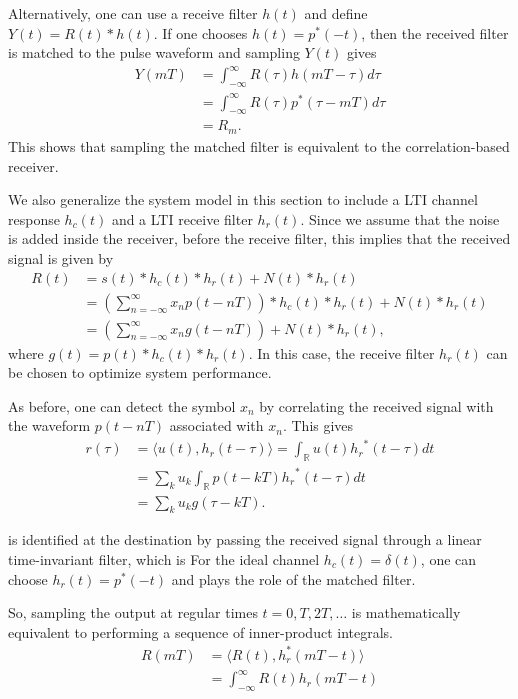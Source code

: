 Alternatively, one can use a receive filter $h(t)$ and define $Y(t) = R(t) * h(t)$.
If one chooses $h(t) = p^* (-t)$, then the received filter is matched to the pulse waveform and sampling $Y(t)$ gives
\begin{align*}
Y(mT)
&= \int_{-\infty}^{\infty} R(\tau) h(mT-\tau) d \tau \\
&= \int_{-\infty}^{\infty} R(\tau) p^* (\tau - mT) d \tau \\
&= R_m .
\end{align*}
This shows that sampling the matched filter is equivalent to the correlation-based receiver.


\iffalse
We also generalize the system model in this section to include a LTI channel response $h_c (t)$ and a LTI receive filter $h_r (t)$.
Since we assume that the noise is added inside the receiver, before the receive filter, this implies that the received signal is given by
\begin{align*}
R(t)
&= s(t) * h_c (t) * h_r (t) + N(t) * h_r(t) \\
&= \left( \sum_{n = -\infty}^{\infty} x_n p (t - nT) \right) * h_c (t) * h_r (t) + N(t) * h_r(t) \\
&= \left( \sum_{n = -\infty}^{\infty} x_n g(t - nT) \right) + N(t) * h_r(t),
\end{align*}
where $g(t) = p (t) * h_c (t) * h_r (t)$.
In this case, the receive filter $h_r (t)$ can be chosen to optimize system performance.

As before, one can detect the symbol $x_n$  by correlating the received signal with the waveform $p(t-nT)$ associated with $x_n$.
This gives
\begin{equation} \label{equation:InnerProductReceiver}
\begin{split}
r(\tau) &= \langle u(t), h_r (t-\tau) \rangle
= \int_{\mathbb{R}} u(t) {h_r}^*(t-\tau) dt \\
&= \sum_{k} u_k \int_{\mathbb{R}} p(t - kT) {h_r}^*(t-\tau) dt \\
&= \sum_{k} u_k g(\tau - kT) .
\end{split}
\end{equation}

is identified at the destination by passing the received signal through a linear time-invariant filter, which is 
For the ideal channel $h_c(t) = \delta(t)$, one can choose $h_r (t) = p^* (-t)$
 and plays the role of the matched filter.

So, sampling the output at regular times $t=0,T,2T,\ldots$ is mathematically equivalent to performing a sequence of inner-product integrals.
\begin{align*}
R(mT)
&= \langle R(t), h_{r}^* (mT-t) \rangle \\
&= \int_{-\infty}^{\infty} R(t) h_{r} (mT-t)
\end{align*}

